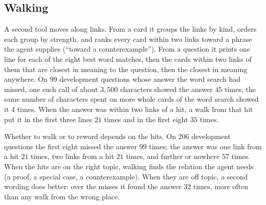 \subsection{Walking}
A second tool moves along links. From a card it groups the links by kind, orders each group by strength, and ranks every card within two links toward a phrase the agent supplies (``toward a counterexample''). From a question it prints one line for each of the eight best word matches, then the cards within two links of them that are closest in meaning to the question, then the closest in meaning anywhere. On $99$ development questions whose answer the word search had missed, one such call of about $3{,}500$ characters showed the answer $45$ times; the same number of characters spent on more whole cards of the word search showed it $4$ times. When the answer was within two links of a hit, a walk from that hit put it in the first three lines $21$ times and in the first eight $35$ times.

Whether to walk or to reword depends on the hits. On $206$ development questions the first eight missed the answer $99$ times; the answer was one link from a hit $21$ times, two links from a hit $21$ times, and further or nowhere $57$ times. When the hits are on the right topic, walking finds the relation the agent needs (a proof, a special case, a counterexample). When they are off topic, a second wording does better: over the misses it found the answer $32$ times, more often than any walk from the wrong place.
